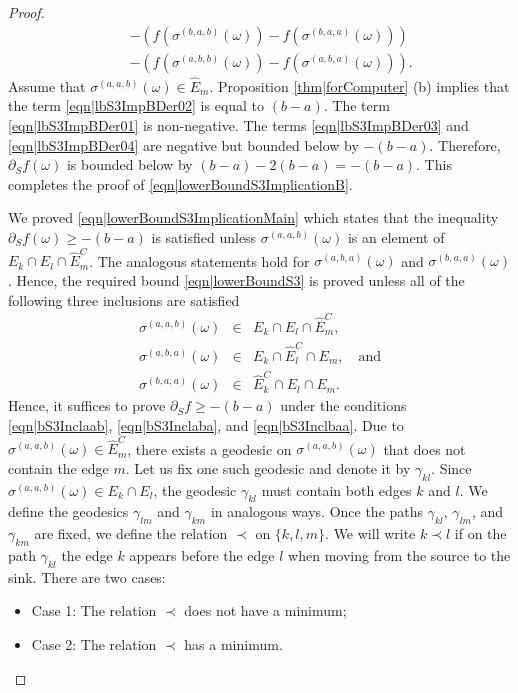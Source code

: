 \documentclass[10pt,a4paper]{amsart}
\begin{document}
\begin{proof}
\begin{eqnarray}
&&-\left(f(\sigma^{(b,a,b)}(\omega))-f(\sigma^{(b,a,a)}(\omega))\right) \label{eqn|lbS3ImpBDer03}\\
&&-\left(f(\sigma^{(a,b,b)}(\omega))-f(\sigma^{(a,b,a)}(\omega))
\right). \label{eqn|lbS3ImpBDer04}
\end{eqnarray}
Assume that $\sigma^{(a,a,b)}(\omega)\in \hat E_m$. Proposition \ref{thm|forComputer} (b) implies that the term \eqref{eqn|lbS3ImpBDer02} is equal to $(b-a)$. The term 
\eqref{eqn|lbS3ImpBDer01} is non-negative. The terms \eqref{eqn|lbS3ImpBDer03} and \eqref{eqn|lbS3ImpBDer04} are negative but bounded below by $-(b-a)$. Therefore, $\partial_Sf(\omega)$ is bounded below by $(b-a)-2(b-a)=-(b-a)$. This completes the proof of \eqref{eqn|lowerBoundS3ImplicationB}. 

We proved \eqref{eqn|lowerBoundS3ImplicationMain} which states that the inequality $\partial_S f(\omega)\geq -(b-a)$ is satisfied unless 
$\sigma^{(a,a,b)}(\omega)$ is an element of $E_k\cap E_l\cap \hat E_m^C$. The analogous statements hold for $\sigma^{(a,b,a)}(\omega)$ and $\sigma^{(b,a,a)}(\omega)$. Hence, the required bound \eqref{eqn|lowerBoundS3} is proved unless all of the following three inclusions are satisfied
\begin{eqnarray}
\sigma^{(a,a,b)}(\omega)&\in& E_k\cap E_l\cap \hat E_m^C, \label{eqn|bS3Inclaab}\\
\sigma^{(a,b,a)}(\omega)&\in& E_k\cap \hat E_l^C\cap E_m,\quad\mbox{and} \label{eqn|bS3Inclaba}\\
\sigma^{(b,a,a)}(\omega)&\in& \hat E_k^C\cap E_l\cap E_m. \label{eqn|bS3Inclbaa}
\end{eqnarray}
Hence, it suffices to prove $\partial_Sf\geq -(b-a)$ under the conditions \eqref{eqn|bS3Inclaab}, \eqref{eqn|bS3Inclaba}, and \eqref{eqn|bS3Inclbaa}.
Due to $\sigma^{(a,a,b)}(\omega)\in \hat E_m^C$, there exists a geodesic on $\sigma^{(a,a,b)}(\omega)$ that does not contain the edge $m$. Let us fix one such geodesic and denote it by $\gamma_{kl}$. Since $\sigma^{(a,a,b)}(\omega)\in E_k\cap E_l$, the geodesic $\gamma_{kl}$ must contain both edges $k$ and $l$. We define the geodesics $\gamma_{lm}$ and $\gamma_{km}$ in analogous ways. Once the paths $\gamma_{kl}$, $\gamma_{lm}$, and $\gamma_{km}$ are fixed, we define the relation $\prec$ on $\{k,l,m\}$. We will write $k\prec l$ if on the path $\gamma_{kl}$ the edge $k$ appears before the edge $l$ when moving from the source to the sink. There are two cases: 
\begin{itemize}
\item Case 1: The relation $\prec$ does not have a minimum;
\item Case 2: The relation $\prec$ has a minimum.
\end{itemize}


\end{proof}
\end{document}
